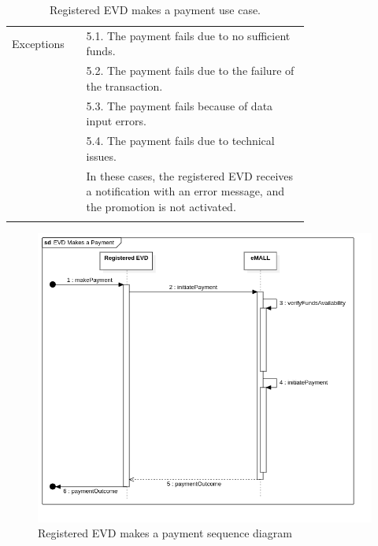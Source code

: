 \begin{center}
\begin{longtable}{lp{0.75\linewidth}}
        \hline
        Exceptions       & 5.1. The payment fails due to no sufficient funds.                                                                    \\
        & 5.2. The payment fails due to the failure of the transaction.                                                         \\
        & 5.3. The payment fails because of data input errors.                                                                  \\
        & 5.4. The payment fails due to technical issues.                                                                       \\
        & In these cases, the registered EVD receives a notification with an error message, and the promotion is not activated. \\
        \hline
        \caption{Registered EVD makes a payment use case.}
        \label{tab: EVD_pays_use_case}
    \end{longtable}

    \begin{figure} [H]
        \begin{center}
            \includegraphics[width=0.9\linewidth]{Images/SequenceDiagrams/evd_makes_a_payment}
            \caption{Registered EVD makes a payment sequence diagram}
            \label{fig: evd_pays_seq_diag}
        \end{center}
    \end{figure}
\end{center}

